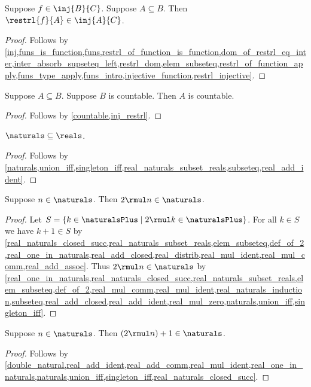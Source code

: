 \begin{lemma}\label{inj_restrl}
    Suppose $f\in\inj{B}{C}$.
    Suppose $A\subseteq B$.
    Then $\restrl{f}{A}\in\inj{A}{C}$.
\end{lemma}
\begin{proof}
    Follows by \cref{inj,funs_is_function,funs,restrl_of_function_is_function,dom_of_restrl_eq_inter,inter_absorb_supseteq_left,restrl_dom,elem_subseteq,restrl_of_function_apply,funs_type_apply,funs_intro,injective_function,restrl_injective}.
\end{proof}

\begin{lemma}\label{subseteq_countable_is_countable}
    Suppose $A\subseteq B$.
    Suppose $B$ is countable.
    Then $A$ is countable.
\end{lemma}
\begin{proof}
    Follows by \cref{countable,inj_restrl}.
\end{proof}

\begin{lemma}\label{naturals_subset_reals}
    $\naturals\subseteq\reals$.
\end{lemma}
\begin{proof}
    Follows by \cref{naturals,union_iff,singleton_iff,real_naturals_subset_reals,subseteq,real_add_ident}.
\end{proof}

\begin{lemma}\label{double_natural}
    Suppose $n\in\naturals$.
    Then $2\rmul n\in\naturals$.
\end{lemma}
\begin{proof}
    Let $S=\{k\in\naturalsPlus\mid \text{$2\rmul k\in\naturalsPlus$}\}$.
    For all $k\in S$ we have $k+1\in S$ by \cref{real_naturals_closed_succ,real_naturals_subset_reals,elem_subseteq,def_of_2,real_one_in_naturals,real_add_closed,real_distrib,real_mul_ident,real_mul_comm,real_add_assoc}.
    Thus $2\rmul n\in\naturals$ by \cref{real_one_in_naturals,real_naturals_closed_succ,real_naturals_subset_reals,elem_subseteq,def_of_2,real_mul_comm,real_mul_ident,real_naturals_induction,subseteq,real_add_closed,real_add_ident,real_mul_zero,naturals,union_iff,singleton_iff}.
\end{proof}

\begin{lemma}\label{double_succ_natural}
    Suppose $n\in\naturals$.
    Then $(2\rmul n)+1\in\naturals$.
\end{lemma}
\begin{proof}
    Follows by \cref{double_natural,real_add_ident,real_add_comm,real_mul_ident,real_one_in_naturals,naturals,union_iff,singleton_iff,real_naturals_closed_succ}.
\end{proof}


